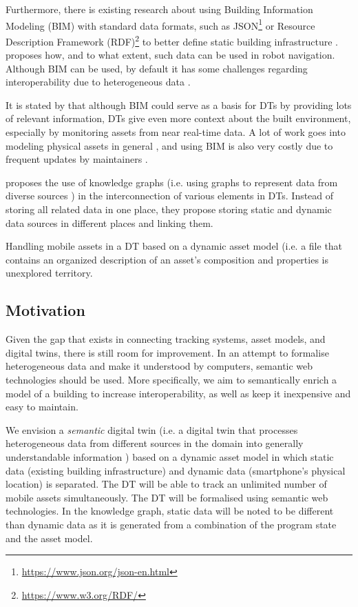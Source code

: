 \documentclass{article}
\begin{document}
Furthermore, there is existing research about using Building Information Modeling (BIM) with standard data formats, such as JSON\footnote{\url{https://www.json.org/json-en.html}} or Resource Description Framework (RDF)\footnote{\url{https://www.w3.org/RDF/}} to better define static building infrastructure \cite{pauwels_live_2023}. \citeauthor{pauwels_live_2023} proposes how, and to what extent, such data can be used in robot navigation. Although BIM can be used, by default it has some challenges regarding interoperability due to heterogeneous data \cite{dinis_bim_2022,godager_concept_2021}. 

It is stated by \citeauthor{godager_concept_2021} that although BIM could serve as a basis for DTs by providing lots of relevant information, DTs give even more context about the built environment, especially by monitoring assets from near real-time data. A lot of work goes into modeling physical assets in general \cite{waszak_let_2022}, and using BIM is also very costly due to frequent updates by maintainers \cite{hamledari_ifc-based_2018}.

\citeauthor{waszak_let_2022} proposes the use of knowledge graphs (i.e. using graphs to represent data from diverse sources \cite{hogan_introduction_2022, ryen_building_2022}) in the interconnection of various elements in DTs. Instead of storing all related data in one place, they propose storing static and dynamic data sources in different places and linking them.

Handling mobile assets in a DT based on a dynamic asset model (i.e. a file that contains an organized description of an asset's composition and properties \cite{kamburjan_twinning-by-construction_2022} is unexplored territory.


\subsection{Motivation}
Given the gap that exists in connecting tracking systems, asset models, and digital twins, there is still room for improvement. In an attempt to formalise heterogeneous data and make it understood by computers, semantic web technologies should be used. More specifically, we aim to semantically enrich a model of a building to increase interoperability, as well as keep it inexpensive and easy to maintain.

We envision a \emph{semantic} digital twin (i.e. a digital twin that processes heterogeneous data from different sources in the domain into generally understandable information \cite{birgit_boss_digital_nodate}) based on a dynamic asset model in which static data (existing building infrastructure) and dynamic data (smartphone's physical location) is separated. The DT will be able to track an unlimited number of mobile assets simultaneously. The DT will be formalised using semantic web technologies. In the knowledge graph, static data will be noted to be different than dynamic data as it is generated from a combination of the program state and the asset model. 
\end{document}
